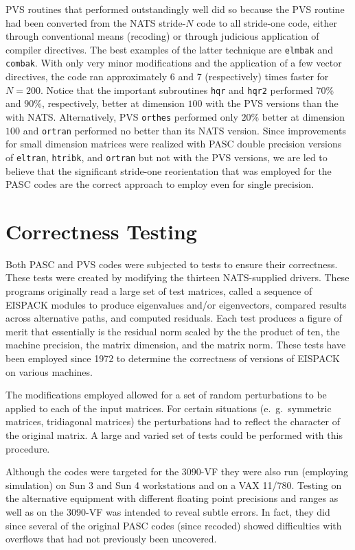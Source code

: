 PVS routines that performed outstandingly well did so because
the PVS routine had been converted from the NATS stride-$N$ code
to all stride-one code, either through conventional means (recoding)
or through judicious application of compiler directives.
The best examples of the latter technique are {\tt elmbak} and {\tt combak}.
With only very minor modifications and the application of a few
vector directives, the code ran approximately 6 and 7 (respectively)
times faster for $N = 200$.
Notice that the important subroutines {\tt hqr} and {\tt hqr2}
performed $70$\% and $90$\%, respectively, better at dimension $100$
with the PVS versions than the with NATS. Alternatively, PVS {\tt orthes}
performed only $20$\% better at dimension $100$ and {\tt ortran}
performed no better than its NATS version.
Since improvements for small dimension matrices were realized 
with PASC double precision versions of {\tt eltran}, {\tt htribk},
and {\tt ortran} but not with the PVS versions, we are led
to believe that the significant stride-one reorientation
that was employed for the PASC codes are the correct approach
to employ even for single precision.

\section{Correctness Testing}
Both PASC and PVS codes were subjected to tests to ensure
their correctness. These tests were created by modifying
the thirteen NATS-supplied drivers. These programs originally read
a large set of test matrices, called a sequence of EISPACK
modules to produce eigenvalues and/or eigenvectors, compared
results across alternative paths, and computed residuals.
Each test produces a figure of merit that essentially is
the residual norm scaled by the the product of ten, the
machine precision, the matrix dimension, and the matrix norm.
These tests have been employed since 1972 to determine the
correctness of versions of EISPACK on various machines.

The modifications employed allowed for a set of random perturbations
to be applied to each of the input matrices. For certain
situations (e.\ g.\ symmetric matrices, tridiagonal matrices)
the perturbations had to 
reflect the character of the original matrix. A large and varied set
of tests could be performed with this procedure.

Although the codes were targeted
for the 3090-VF they were also run (employing simulation) on
Sun 3 and Sun 4 workstations and on a VAX 11/780. Testing on the
alternative equipment with different floating point precisions
and ranges as well as on the 3090-VF was intended to reveal
subtle errors. In fact, they did since several of the original
PASC codes (since recoded) showed difficulties with
overflows that had not previously been uncovered.

